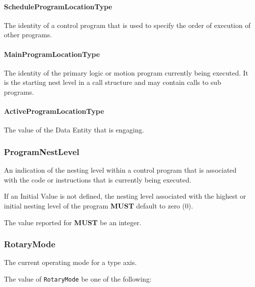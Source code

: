 \paragraph{ScheduleProgramLocationType}\mbox{}
\label{sec:ScheduleProgramLocationType}


The identity of a control program that is used to specify the order of execution of other programs.


\paragraph{MainProgramLocationType}\mbox{}
\label{sec:MainProgramLocationType}


The identity of the primary logic or motion program currently being executed. It is the starting nest level in a call structure and may contain calls to sub programs.


\paragraph{ActiveProgramLocationType}\mbox{}
\label{sec:ActiveProgramLocationType}


The value of the \gls{Data Entity} that is engaging.


\subsubsection{ProgramNestLevel}
\label{sec:ProgramNestLevel}



An indication of the nesting level within a control program that is associated with the code or instructions that is currently being executed.
  
 If an Initial Value is not defined, the nesting level associated with the highest or initial nesting level of the program \textbf{MUST} default to zero (0).
  
 The value reported for  \textbf{MUST} be an integer.


\subsubsection{RotaryMode}
\label{sec:RotaryMode}



The current operating mode for a  type axis.


The value of \texttt{RotaryMode} \MUST be one of the following: 


